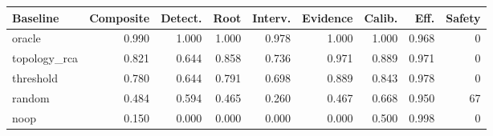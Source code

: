 \begin{tabular}{lrrrrrrrr}
\toprule
Baseline & Composite & Detect. & Root & Interv. & Evidence & Calib. & Eff. & Safety \\
\midrule
oracle & 0.990 & 1.000 & 1.000 & 0.978 & 1.000 & 1.000 & 0.968 & 0 \\
topology\_rca & 0.821 & 0.644 & 0.858 & 0.736 & 0.971 & 0.889 & 0.971 & 0 \\
threshold & 0.780 & 0.644 & 0.791 & 0.698 & 0.889 & 0.843 & 0.978 & 0 \\
random & 0.484 & 0.594 & 0.465 & 0.260 & 0.467 & 0.668 & 0.950 & 67 \\
noop & 0.150 & 0.000 & 0.000 & 0.000 & 0.000 & 0.500 & 0.998 & 0 \\
\bottomrule
\end{tabular}

